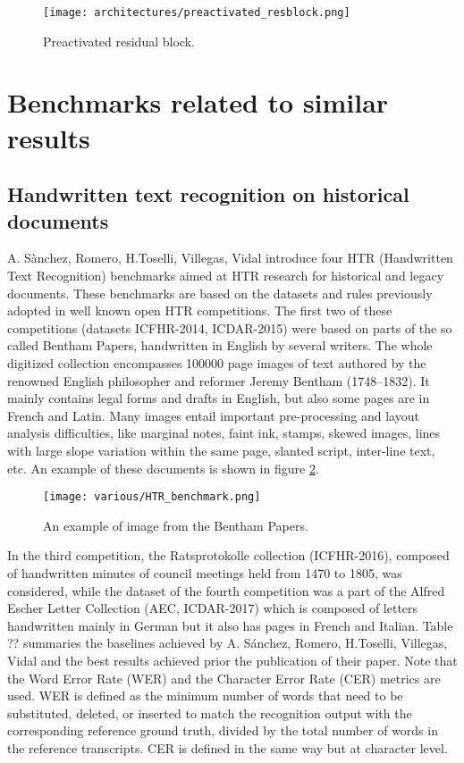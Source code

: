 \begin{figure}[h]
	\caption{Preactivated residual block.}
	\centering
	\texttt{[image: architectures/preactivated\_resblock.png]}
	\label{fig:preact_resblock}
\end{figure}

\section{Benchmarks related to similar results}
\label{sec:stateofart}

\subsection{Handwritten text recognition on historical documents}
\label{ssec:historicaldocuments}

A. Sànchez, Romero, H.Toselli, Villegas, Vidal  introduce four HTR (Handwritten Text Recognition) benchmarks aimed at HTR research for historical and legacy documents. These benchmarks are based on the datasets and rules previously adopted in well known open HTR competitions. The first two of these competitions (datasets ICFHR-2014, ICDAR-2015) were based on parts of the so called Bentham Papers, handwritten in English by several writers. The whole digitized collection encompasses 100000 page images of text authored by the renowned English philosopher and reformer Jeremy Bentham (1748–1832). It mainly contains legal forms and drafts in English, but also some pages are in French and Latin. Many images entail important pre-processing and layout analysis difficulties, like marginal notes, faint ink, stamps, skewed images, lines with large slope variation within the same page, slanted script, inter-line text, etc. An example of these documents is shown in figure \ref{fig:HTR_benchmark}.


\begin{figure}[h]
	\caption{An example of image from the Bentham Papers.}
	\centering
	\texttt{[image: various/HTR\_benchmark.png]}
	\label{fig:HTR_benchmark}
\end{figure}

In the third competition, the Ratsprotokolle collection (ICFHR-2016), composed of handwritten minutes of council meetings held from 1470 to 1805, was considered, while the dataset of the fourth competition was a part of the Alfred Escher Letter Collection (AEC, ICDAR-2017) which is composed of letters handwritten mainly in German but it also has pages in French and Italian. Table ?? summaries the baselines achieved by A. Sánchez, Romero, H.Toselli, Villegas, Vidal and the best results achieved prior the publication of their paper. Note that the Word Error Rate (WER) and the Character Error Rate (CER) metrics are used. WER is defined as the minimum number of words that need to be substituted, deleted, or inserted to match the recognition output with the corresponding reference ground truth, divided by the total number of words in the reference transcripts. CER is defined in the same way but at character level.

